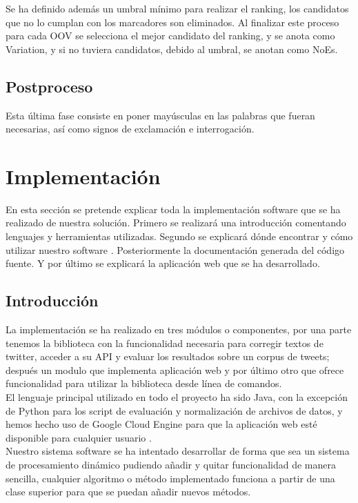 \documentclass[spanish,12pt, a4paper,twoside]{paper}
\let\oldsection\section
\def\section{\cleardoublepage\oldsection}
\begin{document}
Se ha definido además un umbral mínimo para realizar el ranking, los candidatos que no lo cumplan con los marcadores son eliminados. Al finalizar este proceso para cada OOV se selecciona el mejor candidato del ranking, y se anota como Variation, y si no tuviera candidatos, debido al umbral, se anotan como NoEs.

\subsection{Postproceso}\label{sec:postproceso}
Esta última fase consiste en poner mayúsculas en las palabras que fueran necesarias, así como signos de exclamación e interrogación.

\section{Implementación}\label{sec:implementacion}
En esta sección se pretende explicar toda la implementación software que se ha realizado de nuestra solución. Primero se realizará una introducción comentando lenguajes y herramientas utilizadas. Segundo se explicará dónde encontrar y cómo utilizar nuestro software . Posteriormente la documentación generada del código fuente. Y por último se explicará la aplicación web que se ha desarrollado.

\subsection{Introducción}\label{sec:introduccion}
La implementación se ha realizado en tres módulos o componentes, por una parte tenemos la biblioteca con la funcionalidad necesaria para corregir textos de twitter, acceder a su API y evaluar los resultados sobre un corpus de tweets; después un modulo que implementa aplicación web y por último otro que ofrece funcionalidad para utilizar la biblioteca desde línea de comandos.\\

El lenguaje principal utilizado en todo el proyecto ha sido Java, con la excepción de Python para los script de evaluación y normalización de archivos de datos, y hemos hecho uso de Google Cloud Engine \cite{googlecloudengine} para que la aplicación web esté disponible para cualquier usuario \cite{tweetscweb:spellchecker}.\\

Nuestro sistema software se ha intentado desarrollar de forma que sea un sistema de procesamiento dinámico pudiendo añadir y quitar funcionalidad de manera sencilla, cualquier algoritmo o método implementado funciona a partir de una clase superior para que se puedan añadir nuevos métodos.\\
\end{document}
